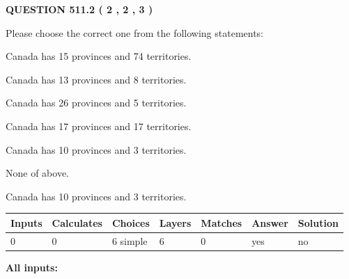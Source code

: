 \documentclass[12pt]{article}
\begin{document}
   
  
\vspace{0.2in}
  
{\textbf{\Large{QUESTION
511.2 
 ( 2 , 2 , 3 )
}}}
  
  
Please choose the correct one from the following statements:
 
 
Canada has  15 provinces and  74 territories.
 
 
Canada has  13 provinces and  8 territories.
 
 
Canada has  26 provinces and  5 territories.
 
 
Canada has  17 provinces and  17 territories.
 
 
Canada has 10  provinces and 3 territories.
 
 
 None of above.
 
 
\noindent{}
 
 
Canada has 10  provinces and 3 territories.
 
 
\noindent{}
 
 
   
   
   
   
\noindent\begin{tabular}{|l|l|l|l|l|l|l|}
 \hline
Inputs & Calculates & Choices & Layers & Matches & Answer & Solution \\ \hline
 0  & 
 0  & 
 6
  simple  
  & 
 6  & 
 0  & 
  yes & 
  no 
  \\ \hline
 \end{tabular}
   
   
   
   
\noindent{}
   
   
   
   
\noindent\vspace{0.1in}\hspace{-0.08in} {\textbf{\Large{All inputs: }}}
   
   
   
   
   
   
 \vspace{0.2in}
 
\end{document}
